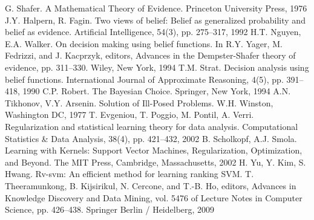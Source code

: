 \documentclass[12pt,a4paper,oneside]{article}
\begin{document}
\begin{thebibliography}{9}
	 G. Shafer. A Mathematical Theory of Evidence. Princeton University Press, 1976%
	 J.Y. Halpern, R. Fagin. Two views of belief: Belief as generalized probability and belief as evidence. Artificial Intelligence, 54(3), pp. 275–317, 1992%
	 H.T. Nguyen,  E.A. Walker. On decision making using belief functions. In R.Y. Yager, M. Fedrizzi, and J. Kacprzyk, editors, Advances in the Dempster-Shafer theory of evidence, pp. 311–330. Wiley, New York, 1994%
	 T.M. Strat. Decision analysis using belief functions. International Journal of Approximate Reasoning, 4(5), pp. 391–418, 1990%
	 C.P. Robert. The Bayesian Choice. Springer, New York, 1994%
	 A.N. Tikhonov, V.Y. Arsenin. Solution of Ill-Posed Problems. W.H. Winston, Washington DC, 1977%
	 T. Evgeniou, T. Poggio, M. Pontil, A. Verri. Regularization and statistical learning theory for data analysis. Computational Statistics & Data Analysis, 38(4), pp. 421–432, 2002%
	 B. Scholkopf, A.J. Smola. Learning with Kernels: Support Vector Machines, Regularization, Optimization, and Beyond. The MIT Press, Cambridge, Massachusetts, 2002%
	 H. Yu, Y. Kim, S. Hwang. Rv-svm: An efficient method for learning ranking SVM. T. Theeramunkong, B. Kijsirikul, N. Cercone, and T.-B. Ho, editors, Advances in Knowledge Discovery and Data Mining, vol. 5476 of Lecture Notes in Computer Science, pp. 426–438. Springer Berlin / Heidelberg, 2009%
\end{thebibliography}
\end{document}
